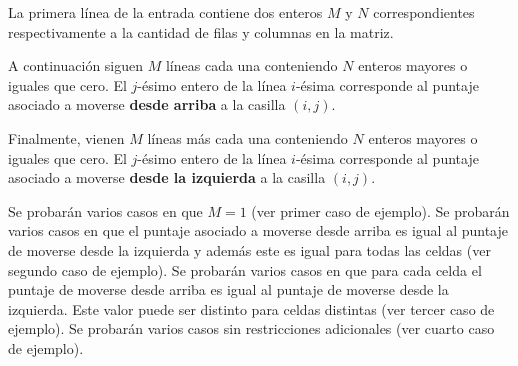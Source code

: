 \documentclass{oci}
\begin{document}
\begin{inputDescription}
  La primera línea de la entrada contiene dos enteros $M$ y $N$ correspondientes respectivamente
  a la cantidad de filas y columnas en la matriz.

  A continuación siguen $M$ líneas cada una conteniendo $N$ enteros mayores o iguales que cero.
  El $j$-ésimo entero de la línea $i$-ésima corresponde al puntaje asociado a moverse {\bf desde arriba}
  a la casilla $(i, j)$.

  Finalmente, vienen $M$ líneas más cada una conteniendo $N$ enteros mayores o iguales que cero.
  El $j$-ésimo entero de la línea $i$-ésima corresponde al puntaje asociado a moverse {\bf desde la izquierda}
  a la casilla $(i, j)$.
\end{inputDescription}

\begin{outputDescription}
\end{outputDescription}

\begin{scoreDescription}
  Se probarán varios casos en que $M=1$ (ver primer caso de ejemplo).
  Se probarán varios casos en que el puntaje asociado a moverse desde arriba es igual al puntaje
  de moverse desde la izquierda y además este es igual para todas las celdas
  (ver segundo caso de ejemplo).
  Se probarán varios casos en que para cada celda el puntaje de moverse desde arriba es igual al
  puntaje de moverse desde la izquierda. Este valor puede ser distinto para celdas distintas
  (ver tercer caso de ejemplo).
  Se probarán varios casos sin restricciones adicionales
  (ver cuarto caso de ejemplo).
\end{scoreDescription}

\begin{sampleDescription}
\end{sampleDescription}
\end{document}
